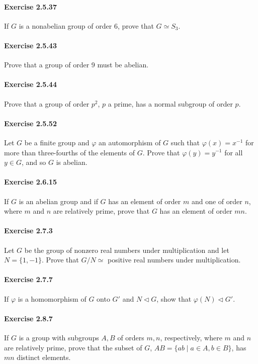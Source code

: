 \documentclass{article}
\begin{document}
\paragraph{Exercise 2.5.37} If $G$ is a nonabelian group of order 6, prove that $G \simeq S_3$.

\paragraph{Exercise 2.5.43} Prove that a group of order 9 must be abelian.

\paragraph{Exercise 2.5.44} Prove that a group of order $p^2$, $p$ a prime, has a normal subgroup of order $p$.

\paragraph{Exercise 2.5.52} Let $G$ be a finite group and $\varphi$ an automorphism of $G$ such that $\varphi(x) = x^{-1}$ for more than three-fourths of the elements of $G$. Prove that $\varphi(y) = y^{-1}$ for all $y \in G$, and so $G$ is abelian.

\paragraph{Exercise 2.6.15} If $G$ is an abelian group and if $G$ has an element of order $m$ and one of order $n$, where $m$ and $n$ are relatively prime, prove that $G$ has an element of order $mn$.

\paragraph{Exercise 2.7.3} Let $G$ be the group of nonzero real numbers under multiplication and let $N = \{1, -1\}$. Prove that $G / N \simeq$ positive real numbers under multiplication.

\paragraph{Exercise 2.7.7} If $\varphi$ is a homomorphism of $G$ onto $G'$ and $N \triangleleft G$, show that $\varphi(N) \triangleleft G'$.

\paragraph{Exercise 2.8.7} If $G$ is a group with subgroups $A, B$ of orders $m, n$, respectively, where $m$ and $n$ are relatively prime, prove that the subset of $G$, $AB = \{ab \mid a \in A, b \in B\}$, has $mn$ distinct elements.
\end{document}
